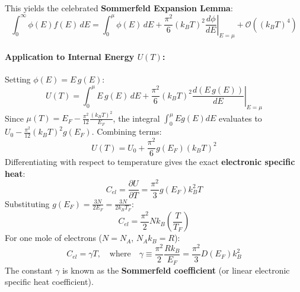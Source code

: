 \documentclass[11pt,a4paper]{article}
\begin{document}
This yields the celebrated \textbf{Sommerfeld Expansion Lemma}:
\begin{equation}
\boxed{\int_0^\infty \phi(E)f(E)\,dE = \int_0^\mu \phi(E)\,dE + \frac{\pi^2}{6}(k_B T)^2 \left.\frac{d\phi}{dE}\right|_{E=\mu} + \mathcal{O}\left((k_B T)^4\right)}
\label{eq:sommerfeld_lemma}
\end{equation}

\paragraph{Application to Internal Energy $U(T)$:}
Setting $\phi(E) = E\,g(E)$:
\begin{equation}
U(T) = \int_0^\mu E\,g(E)\,dE + \frac{\pi^2}{6}(k_B T)^2 \left.\frac{d(E\,g(E))}{dE}\right|_{E=\mu}
\end{equation}
Since $\mu(T) = E_F - \frac{\pi^2}{12}\frac{(k_BT)^2}{E_F}$, the integral $\int_0^\mu E g(E)dE$ evaluates to $U_0 - \frac{\pi^2}{12}(k_BT)^2 g(E_F)$. Combining terms:
\begin{equation}
U(T) = U_0 + \frac{\pi^2}{6}g(E_F)(k_B T)^2
\label{eq:thermal_internal_energy}
\end{equation}
Differentiating with respect to temperature gives the exact \textbf{electronic specific heat}:
\begin{equation}
\boxed{C_{el} = \frac{\partial U}{\partial T} = \frac{\pi^2}{3}g(E_F) k_B^2 T}
\label{eq:c_el_dos}
\end{equation}
Substituting $g(E_F) = \frac{3N}{2E_F} = \frac{3N}{2k_B T_F}$:
\begin{equation}
\boxed{C_{el} = \frac{\pi^2}{2}N k_B \left(\frac{T}{T_F}\right)}
\label{eq:c_el_fermi_temp}
\end{equation}
For one mole of electrons ($N = N_A$, $N_A k_B = R$):
\begin{equation}
\boxed{C_{el} = \gamma T, \quad \text{where} \quad \gamma \equiv \frac{\pi^2}{2}\frac{R k_B}{E_F} = \frac{\pi^2}{3}D(E_F)k_B^2}
\label{eq:sommerfeld_gamma}
\end{equation}
The constant $\gamma$ is known as the \textbf{Sommerfeld coefficient} (or linear electronic specific heat coefficient).
\end{document}
